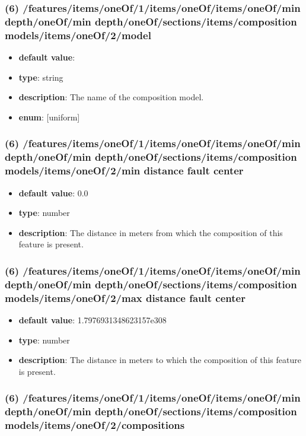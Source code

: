 \subsubsection{(6) /features/items/oneOf/1/items/oneOf/items/oneOf/min depth/oneOf/min depth/oneOf/sections/items/composition models/items/oneOf/2/model}
\begin{itemize}[leftmargin=6em]\item {\bf default value}: 
\item {\bf type}: string
\item {\bf description}: The name of the composition model.
\item {\bf enum}: [uniform]\end{itemize}\subsubsection{(6) /features/items/oneOf/1/items/oneOf/items/oneOf/min depth/oneOf/min depth/oneOf/sections/items/composition models/items/oneOf/2/min distance fault center}
\begin{itemize}[leftmargin=6em]\item {\bf default value}: 0.0
\item {\bf type}: number
\item {\bf description}: The distance in meters from which the composition of this feature is present.
\end{itemize}\subsubsection{(6) /features/items/oneOf/1/items/oneOf/items/oneOf/min depth/oneOf/min depth/oneOf/sections/items/composition models/items/oneOf/2/max distance fault center}
\begin{itemize}[leftmargin=6em]\item {\bf default value}: 1.7976931348623157e308
\item {\bf type}: number
\item {\bf description}: The distance in meters to which the composition of this feature is present.
\end{itemize}\subsubsection{(6) /features/items/oneOf/1/items/oneOf/items/oneOf/min depth/oneOf/min depth/oneOf/sections/items/composition models/items/oneOf/2/compositions}
